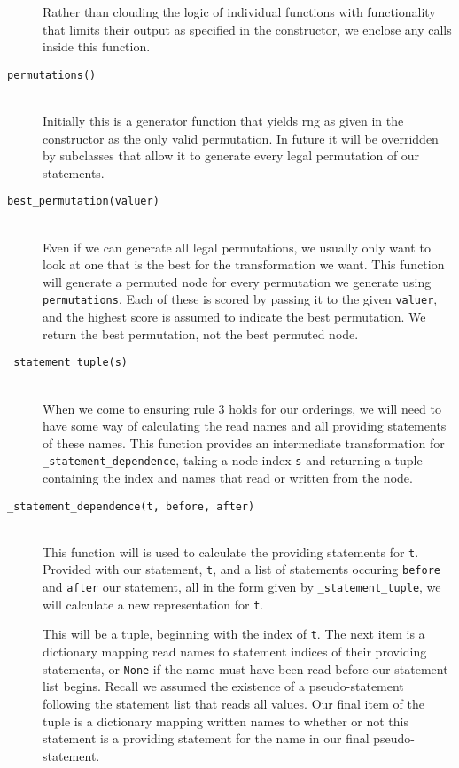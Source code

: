 \documentclass[twoside,a4paper]{report}
\begin{document}
\begin{description}
Rather than clouding the logic of individual functions with functionality that limits their output as specified in the constructor, we enclose any calls
inside this function.

\item[\texttt{permutations()}] \hfill \\
Initially this is a generator function that yields rng as given in the constructor as the only valid permutation. In future it will be overridden by
subclasses that allow it to generate every legal permutation of our statements.

\item[\texttt{best\_permutation(valuer)}] \hfill \\
Even if we can generate all legal permutations, we usually only want to look at one that is the best for the transformation we want. This function
will generate a permuted node for every permutation we generate using \texttt{permutations}. Each of these is scored by passing it to the given
\texttt{valuer}, and the highest score is assumed to indicate the best permutation. We return the best permutation, not the best permuted node.

\item[\texttt{\_statement\_tuple(s)}] \hfill \\
When we come to ensuring rule 3 holds for our orderings, we will need to have some way of calculating the read names and all providing statements
of these names. This function provides an intermediate transformation for \texttt{\_statement\_dependence}, taking a node index \texttt{s} and
returning a tuple containing the index and names that read or written from the node.

\item[\texttt{\_statement\_dependence(t, before, after)}] \hfill \\
This function will is used to calculate the providing statements for \texttt{t}. Provided with our statement, \texttt{t}, and a list of statements
occuring \texttt{before} and \texttt{after} our statement, all in the form given by \texttt{\_statement\_tuple}, we will calculate a new representation
for \texttt{t}.

This will be a tuple, beginning with the index of \texttt{t}. The next item is a dictionary mapping read names to statement indices of their providing
statements, or \texttt{None} if the name must have been read before our statement list begins. Recall we assumed the existence of a pseudo-statement
following the statement list that reads all values. Our final item of the tuple is a dictionary mapping written names to whether or not this statement
is a providing statement for the name in our final pseudo-statement.
\end{description}
\end{document}
